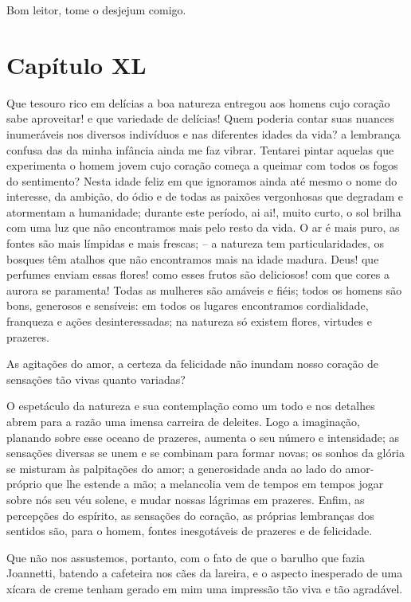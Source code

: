  Bom leitor, tome o desjejum comigo.

\section{Capítulo XL}

 Que tesouro rico em delícias a boa natureza entregou aos homens cujo
coração sabe aproveitar! e que variedade de delícias! Quem poderia
contar suas nuances inumeráveis nos diversos indivíduos e nas
diferentes idades da vida? a lembrança confusa das da minha infância
ainda me faz vibrar. Tentarei pintar aquelas que experimenta o homem
jovem cujo coração começa a queimar com todos os fogos do sentimento?
Nesta idade feliz em que ignoramos ainda até mesmo o nome do interesse,
da ambição, do ódio e de todas as paixões vergonhosas que degradam e
atormentam a humanidade; durante este período, ai ai!, muito curto, o
sol brilha com uma luz que não encontramos mais pelo resto da vida. O
ar é mais puro, as fontes são mais límpidas e mais frescas; -- a
natureza tem particularidades, os bosques têm atalhos que não
encontramos mais na idade madura. Deus! que perfumes enviam essas
flores! como esses frutos são deliciosos! com que cores a aurora se
paramenta! Todas as mulheres são amáveis e fiéis; todos os homens são
bons, generosos e sensíveis: em todos os lugares encontramos
cordialidade, franqueza e ações desinteressadas; na natureza só existem
flores, virtudes e prazeres.

 As agitações do amor, a certeza da felicidade não inundam nosso coração
de sensações tão vivas quanto variadas?

 O espetáculo da natureza e sua contemplação como um todo e nos detalhes
abrem para a razão uma imensa carreira de deleites. Logo a imaginação,
planando sobre esse oceano de prazeres, aumenta o seu número e
intensidade; as sensações diversas se unem e se combinam para formar
novas; os sonhos da glória se misturam às palpitações do amor; a
generosidade anda ao lado do amor-próprio que lhe estende a mão; a
melancolia vem de tempos em tempos jogar sobre nós seu véu solene, e
mudar nossas lágrimas em prazeres. Enfim, as percepções do espírito, as
sensações do coração, as próprias lembranças dos sentidos são, para o
homem, fontes inesgotáveis de prazeres e de felicidade.

 Que não nos assustemos, portanto, com o fato de que o barulho que fazia
Joannetti, batendo a cafeteira nos cães da lareira, e o aspecto
inesperado de uma xícara de creme tenham gerado em mim uma impressão
tão viva e tão agradável.

